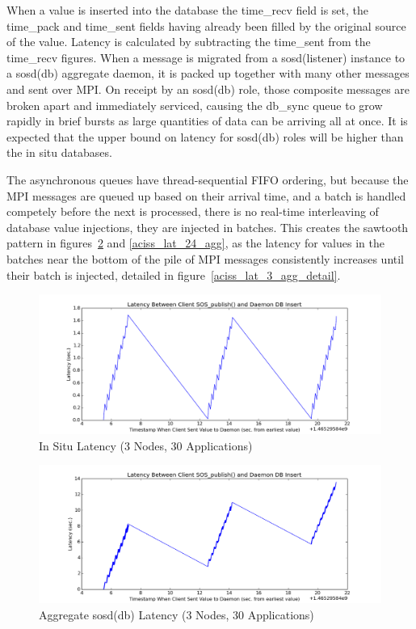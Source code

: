 When a value is inserted into the database the time\_recv field is set,
the time\_pack and time\_sent fields having already been filled by the
original source of the value.
%
Latency is calculated by subtracting the time\_sent from the
time\_recv figures.
%
When a message is migrated from a sosd(listener) instance to a
sosd(db) aggregate daemon, it is packed up together with many other
messages and sent over MPI.
%
On receipt by an sosd(db) role, those composite messages are broken
apart and immediately serviced, causing the db\_sync queue to grow
rapidly in brief bursts as large quantities of data can be arriving
all at once.
%
It is expected that the upper bound on latency for sosd(db) roles will
be higher than the in situ databases.

The asynchronous queues have thread-sequential FIFO ordering, but
because the MPI messages are queued up based on their arrival time,
and a batch is handled competely before the next is processed, there
is no real-time interleaving of database value injections, they are
injected in batches.
%
This creates the sawtooth pattern in figures~\ref{aciss_lat_3_agg} and
\ref{aciss_lat_24_agg}, as the latency for values in the batches near
the bottom of the pile of MPI messages consistently increases until
their batch is injected, detailed in
figure~\ref{aciss_lat_3_agg_detail}.

\begin{figure}[!t]
\centering
\includegraphics[width=5in]{images/aciss_latency_3_situ.png}
\caption{In Situ Latency (3 Nodes, 30 Applications)}
\label{aciss_lat_3_situ}
\end{figure}

\begin{figure}[!t]
\centering
\includegraphics[width=5in]{images/aciss_latency_3_agg.png}
\caption{Aggregate sosd(db) Latency (3 Nodes, 30 Applications)}
\label{aciss_lat_3_agg}
\end{figure}


